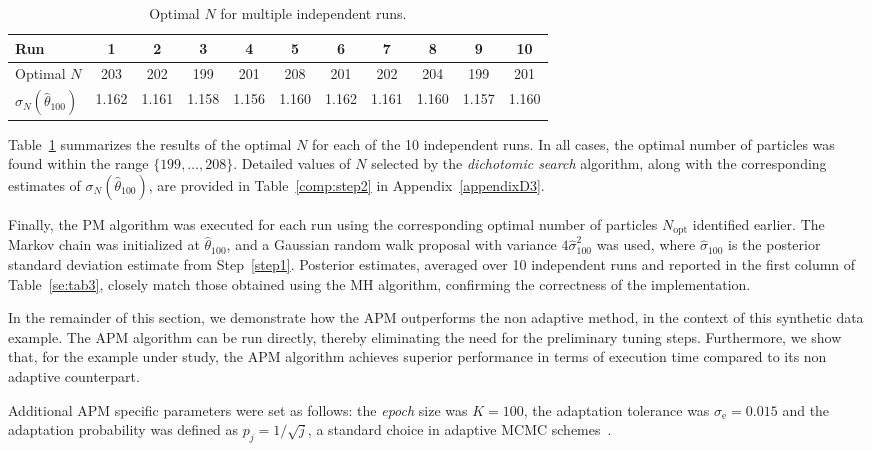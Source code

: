 \documentclass[pdflatex,sn-mathphys-num]{sn-jnl}
\theoremstyle{thmstyleone}
\theoremstyle{thmstyletwo}
\theoremstyle{thmstylethree}
\begin{document}
\begin{table}[h]
\centering
\caption{Optimal $N$ for multiple independent runs.}
\label{tab:optimal_N_runs}
\begin{tabular}{@{}l *{10}{c} @{}}

\toprule
 {Run} & 1 & 2 & 3 & 4 & 5 & 6 & 7 & 8 & 9 & 10 \\
\hline
{Optimal} ${N}$ & 203 & 202 & 199 & 201 & 208 & 201 & 202 & 204 & 199 & 201 \\
$\hat{\sigma}_{N}{(\hat\theta_{100})}$ & 1.162 & 1.161 & 1.158 & 1.156 & 1.160 & 1.162 & 1.161 & 1.160 & 1.157 & 1.160 \\
\bottomrule
\end{tabular}
\end{table}

Table~\ref{tab:optimal_N_runs} summarizes the results of the optimal \( N \) for each of the 10 independent runs. In all cases, the optimal number of particles was found within the range \( \{199, \ldots, 208\} \). Detailed values of \( N \) selected by the \textit{dichotomic search} algorithm, along with the corresponding estimates of \( \sigma_N(\hat\theta_{100}) \), are provided in Table~\ref{comp:step2} in Appendix~\ref{appendixD3}.

Finally, the PM algorithm was executed for each run using the corresponding optimal number of particles \( N_{\text{opt}} \) identified earlier. The Markov chain was initialized at \( \hat{\theta}_{100} \), and a Gaussian random walk proposal with variance \( 4 \hat{\sigma}_{100}^2 \) was used, where \( \hat{\sigma}_{100} \) is the posterior standard deviation estimate from Step~\ref{step1}. Posterior estimates, averaged over 10 independent runs and reported in the first column of Table~\ref{se:tab3}, closely match those obtained using the MH algorithm, confirming the correctness of the implementation. 

In the remainder of this section, we demonstrate how the APM outperforms the non adaptive method, in the context of this synthetic data example. The APM algorithm can be run directly, thereby eliminating the need for the preliminary tuning steps. Furthermore, we show that, for the example under study, the APM algorithm achieves superior performance in terms of execution time compared to its non adaptive counterpart.

Additional APM specific parameters were set as follows: the \textit{epoch} size was \( K = 100 \), the adaptation tolerance was \( \sigma_\text{e} = 0.015 \) and the adaptation probability was defined as \( p_j = 1/\sqrt{j} \), a standard choice in adaptive MCMC schemes~\cite{roberts_examples_2009}.
\end{document}
